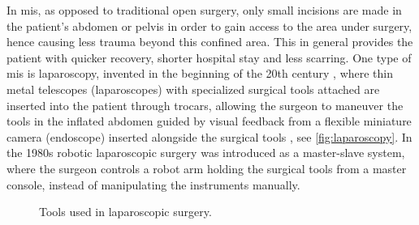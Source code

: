 In \gls{mis}, as opposed to traditional open surgery, only small incisions are made in the patient's abdomen or pelvis in order to gain access to the area under surgery, hence causing less trauma beyond this confined area. This in general provides the patient with quicker recovery, shorter hospital stay and less scarring.
One type of \gls{mis} is \gls{laparoscopy}, invented in the beginning of the 20th century \citep{bib:laparoscopy}, where thin metal telescopes (laparoscopes) with specialized surgical tools attached are inserted into the patient through trocars, allowing the surgeon to maneuver the tools in the inflated abdomen guided by visual feedback from a flexible miniature camera (\gls{endoscope}) inserted alongside the surgical tools \citep{bib:fascrs}, see \autoref{fig:laparoscopy}.
In the 1980s robotic laparoscopic surgery was introduced as a master-slave system, where the surgeon controls a robot arm holding the surgical tools from a master console, instead of manipulating the instruments manually.

\vspace*{3mm}
\begin{figure}[htbp]
\centering
\begin{minipage}{0.39\textwidth}
%
\vspace*{3mm}
%
\end{minipage}
\hspace*{5mm}
\begin{minipage}{0.258\textwidth}
%
\end{minipage}
\hspace*{5mm}
\begin{minipage}{0.258\textwidth}
%
\end{minipage}
\caption{Tools used in laparoscopic surgery.}
\label{fig:laparoscopy}
\end{figure}

